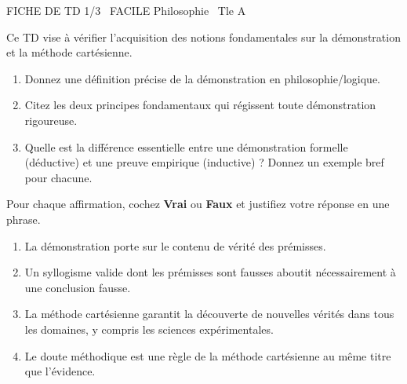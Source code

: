 \documentclass[11pt]{article}
\begin{document}
\begin{tcolorbox}[enhanced,colback=popink,colframe=popink,arc=10pt,boxrule=0pt,left=12pt,right=12pt,top=9pt,bottom=9pt]
{\color{white}\popxbold\small FICHE DE TD 1/3 \textbullet\ FACILE \hfill Philosophie \textbullet\ Tle A\par}
\end{tcolorbox}
\vspace{4pt}
Ce TD vise à vérifier l'acquisition des notions fondamentales sur la démonstration et la méthode cartésienne.

\begin{exercice}
\begin{enumerate}
    \item Donnez une définition précise de la démonstration en philosophie/logique.
    \item Citez les deux principes fondamentaux qui régissent toute démonstration rigoureuse.
    \item Quelle est la différence essentielle entre une démonstration formelle (déductive) et une preuve empirique (inductive) ? Donnez un exemple bref pour chacune.
\end{enumerate}
\end{exercice}

\begin{exercice}
Pour chaque affirmation, cochez \textbf{Vrai} ou \textbf{Faux} et justifiez votre réponse en une phrase.
\begin{enumerate}
    \item La démonstration porte sur le contenu de vérité des prémisses. \hfill {} \quad {}
    \item Un syllogisme valide dont les prémisses sont fausses aboutit nécessairement à une conclusion fausse. \hfill {} \quad {}
    \item La méthode cartésienne garantit la découverte de nouvelles vérités dans tous les domaines, y compris les sciences expérimentales. \hfill {} \quad {}
    \item Le doute méthodique est une règle de la méthode cartésienne au même titre que l'évidence. \hfill {} \quad {}
\end{enumerate}
\end{exercice}
\end{document}
